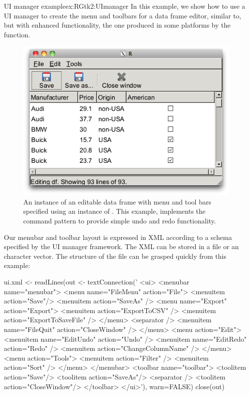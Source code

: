 \begin{example}{UI manager example}{ex:RGtk2:UImanager}
In this example, we show how to use a UI manager to create the menu
and toolbars for a data frame editor, similar to, but with enhanced
functionality, the one produced in some platforms by the
 function. 


\begin{figure}
  \centering
  \includegraphics[width=.7\textwidth]{fig-RGtk2-editable-dataframe}
  \caption{An instance of an editable data frame with menu and tool
    bars specified using an instance of . This
    example, implements the command pattern to provide simple undo and
    redo functionality.}
  \label{fig:RGtk2-editable-dataframe}
\end{figure}





Our menubar and toolbar layout is expressed in XML according to a
schema specified by the UI manager framework. The XML can be stored in
a file or an \R\/ character vector.  The structure of the file can be
grasped quickly from this example:
\begin{Schunk}
\begin{Sinput}
 ui.xml <- readLines(out <- textConnection('
 <ui>
   <menubar name="menubar">
     <menu name="FileMenu" action="File">
       <menuitem action="Save"/>
       <menuitem action="SaveAs" />
       <menu name="Export" action="Export">
         <menuitem action="ExportToCSV" />
         <menuitem action="ExportToSaveFile" />
       </menu>
       <separator />
       <menuitem name="FileQuit" action="CloseWindow" />
     </menu>
     <menu action="Edit">
       <menuitem name="EditUndo" action="Undo" />
       <menuitem name="EditRedo" action="Redo" />
       <menuitem action="ChangeColumnName" />
     </menu>
     <menu action="Tools">
       <menuitem action="Filter" />
       <menuitem action="Sort" />
     </menu>
   </menubar>
   <toolbar name="toolbar">
     <toolitem action="Save"/>
     <toolitem action="SaveAs"/>
     <separator />
     <toolitem action="CloseWindow"/>
   </toolbar>
 </ui>'), warn=FALSE)
 close(out)
\end{Sinput}
\end{Schunk}
%


\end{example}
